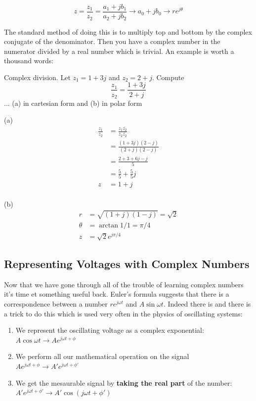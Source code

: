 \documentclass{tufte-book}
\begin{document}
$$
z = \frac{z_1}{z_2} = \frac{a_1+jb_1}{a_2+jb_2} \rightarrow a_0 +jb_0 \rightarrow re^{j\theta} 
$$

The standard method of doing this is to multiply top and bottom by the complex conjugate of the denominator. Then you have a complex number in the numerator divided by a real number which is trivial. An example is worth a thousand words:

\begin{myexample}[label = ex:its_complicateder]{Complex division.}
Let $z_1 = 1 + 3j$ and $z_2 = 2 + j$. Compute 
$$
\frac{z_1}{z_2} = \frac{1 + 3j}{2 + j}
$$
\noindent... (a) in cartesian form and (b) in polar form

(a) \begin{align*}
\frac{z_1}{z_2}  &= \frac{z_1\bar{z_2}}{z_2\bar{z_2}} \\
& = \frac{\left(1+3j\right)\left(2-j\right)}{\left(2+j\right)\left(2-j\right)} \\
&=  \frac{2+3 + 6j-j}{5} \\
&= \frac{5}{5} + \frac{5}{5}j \\
z &= 1+j
\end{align*}
\\
(b)\begin{align*}
r &= \sqrt{(1+j)(1-j)} = \sqrt{2} \\
\theta &= \arctan{1/1} = \pi/4 \\
z &= \sqrt{2}e^{j\pi/4}
\end{align*}
\end{myexample}

\subsection{Representing Voltages with Complex Numbers}
Now that we have gone through all of the trouble of learning complex numbers it's time et something useful back. Euler's formula suggests that there is a correspondence between a number $re^{j\omega t}$ and $A\sin\omega t$. Indeed there is and there is a trick to do this which is used very often in the physics of oscillating systems:

\begin{enumerate}
\item We represent the oscillating voltage as a complex exponential: $A\cos\omega t \rightarrow Ae^{j\omega t + \phi}$
\item We perform all our mathematical operation on the signal $Ae^{j\omega t + \phi}\rightarrow A'e^{j\omega t +\phi'}$
\item We get the mesaurable signal by \textbf{taking the real part} of the number: $A'e^{j\omega t +\phi'} \rightarrow A'\cos(j\omega t +\phi')$
\end{enumerate}
\end{document}

